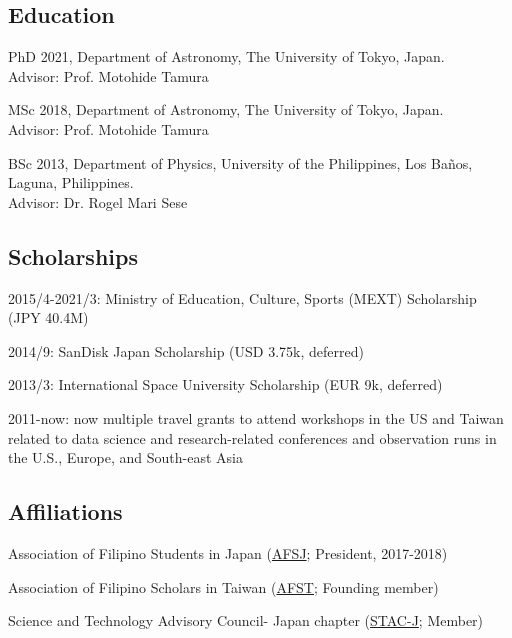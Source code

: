 \documentclass[11pt,letterpaper]{article}
\begin{document}
\subsection{Education}
\begin{list}{}{\cvlist}
    \item
        PhD 2021, Department of Astronomy, The University of Tokyo, Japan.\\Advisor: Prof. Motohide Tamura
    \item
        MSc 2018, Department of Astronomy, The University of Tokyo, Japan.\\Advisor: Prof. Motohide Tamura
    \item
        BSc 2013, Department of Physics, University of the Philippines, Los Ba\~nos, Laguna, Philippines.\\Advisor: Dr. Rogel Mari Sese      
\end{list}

\subsection{Scholarships}
\begin{list}{}{\cvlist}
    \item 2015/4-2021/3: Ministry of Education, Culture, Sports (MEXT) Scholarship (JPY 40.4M)
    \item 2014/9: SanDisk Japan Scholarship (USD 3.75k, deferred)
    \item 2013/3: International Space University Scholarship (EUR 9k, deferred)
    \item 2011-now: now multiple travel grants to attend workshops in the US and Taiwan related to data science and research-related conferences and observation runs in the U.S., Europe, and South-east Asia
\end{list}

\subsection{Affiliations}
\begin{list}{}{\cvlist}
    \item Association of Filipino Students in Japan (\href{https://www.facebook.com/afsjpage/}{AFSJ}; President, 2017-2018)
    \item Association of Filipino Scholars in Taiwan  (\href{https://www.facebook.com/AssocIskolar/}{AFST}; Founding member)
    \item Science and Technology Advisory Council- Japan chapter (\href{https://www.facebook.com/profile.php?id=100083271798519}{STAC-J}; Member)
\end{list}
\end{document}
